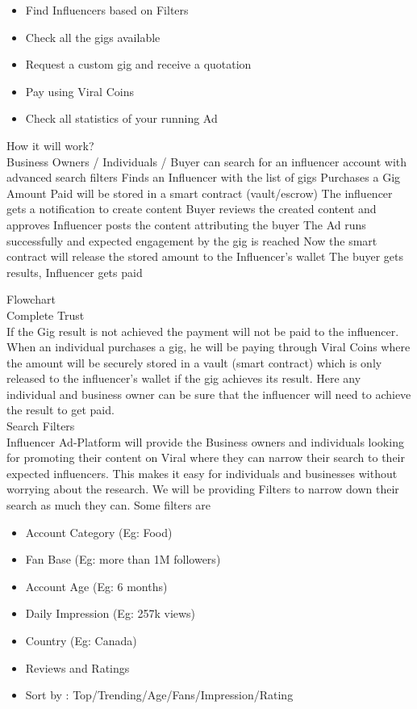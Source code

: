 \documentclass[10pt]{article}
\begin{document}
\begin{itemize}[leftmargin=+0.2in]
\item Find Influencers based on Filters
\item Check all the gigs available
\item Request a custom gig and receive a quotation
\item Pay using Viral Coins
\item Check all statistics of your running Ad
\end{itemize}

How it will work?\\


Business Owners / Individuals / Buyer can search for an influencer account with advanced search filters
Finds an Influencer with the list of gigs 
Purchases a Gig
Amount Paid will be stored in a smart contract (vault/escrow)
The influencer gets a notification to create content
Buyer reviews the created content and approves
Influencer posts the content attributing the buyer
The Ad runs successfully and expected engagement by the gig is reached
Now the smart contract will release the stored amount to the Influencer’s wallet
The buyer gets results, Influencer gets paid

Flowchart\\


Complete Trust\\


If the Gig result is not achieved the payment will not be paid to the influencer. When an individual purchases a gig, he will be paying through Viral Coins where the amount will be securely stored in a vault (smart contract) which is only released to the influencer’s wallet if the gig achieves its result. Here any individual and business owner can be sure that the influencer will need to achieve the result to get paid.\\


Search Filters\\


Influencer Ad-Platform will provide the Business owners and individuals looking for promoting their content on Viral where they can narrow their search to their expected influencers. This makes it easy for individuals and businesses without worrying about the research. We will be providing Filters to narrow down their search as much they can. Some filters are

\begin{itemize}[leftmargin=+0.2in]
\item Account Category (Eg: Food)
\item Fan Base (Eg: more than 1M followers)
\item Account Age (Eg: 6 months)
\item Daily Impression (Eg: 257k views)
\item Country (Eg: Canada)
\item Reviews and Ratings
\item Sort by : Top/Trending/Age/Fans/Impression/Rating 
\end{itemize}
\end{document}
